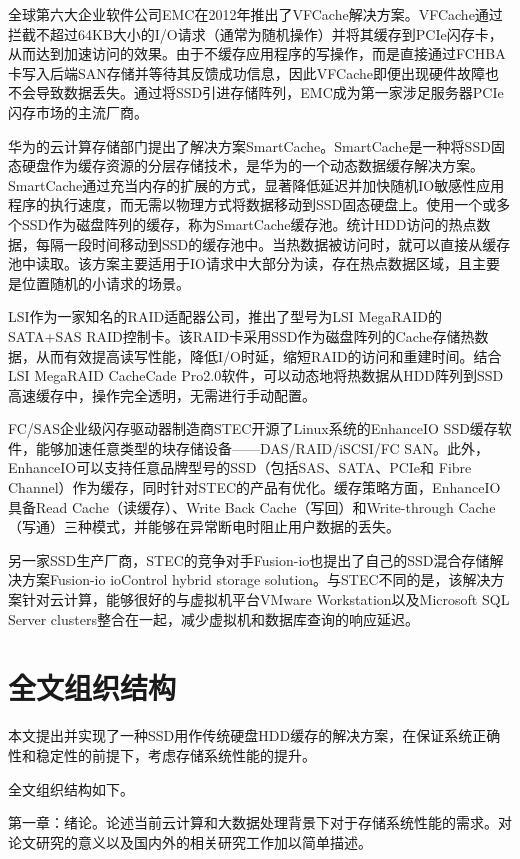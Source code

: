 全球第六大企业软件公司EMC在2012年推出了VFCache解决方案。VFCache通过拦截不超过64KB大小的I/O请求（通常为随机操作）并将其缓存到PCIe闪存卡，从而达到加速访问的效果。由于不缓存应用程序的写操作，而是直接通过FCHBA卡写入后端SAN存储并等待其反馈成功信息，因此VFCache即便出现硬件故障也不会导致数据丢失。通过将SSD引进存储阵列，EMC成为第一家涉足服务器PCIe闪存市场的主流厂商。

华为的云计算存储部门提出了解决方案SmartCache。SmartCache是一种将SSD固态硬盘作为缓存资源的分层存储技术，是华为的一个动态数据缓存解决方案。SmartCache通过充当内存的扩展的方式，显著降低延迟并加快随机IO敏感性应用程序的执行速度，而无需以物理方式将数据移动到SSD固态硬盘上。使用一个或多个SSD作为磁盘阵列的缓存，称为SmartCache缓存池。统计HDD访问的热点数据，每隔一段时间移动到SSD的缓存池中。当热数据被访问时，就可以直接从缓存池中读取。该方案主要适用于IO请求中大部分为读，存在热点数据区域，且主要是位置随机的小请求的场景。

LSI作为一家知名的RAID适配器公司，推出了型号为LSI MegaRAID的SATA+SAS RAID控制卡。该RAID卡采用SSD作为磁盘阵列的Cache存储热数据，从而有效提高读写性能，降低I/O时延，缩短RAID的访问和重建时间。结合LSI MegaRAID CacheCade Pro2.0软件，可以动态地将热数据从HDD阵列到SSD高速缓存中，操作完全透明，无需进行手动配置。

FC/SAS企业级闪存驱动器制造商STEC开源了Linux系统的EnhanceIO SSD缓存软件，能够加速任意类型的块存储设备——DAS/RAID/iSCSI/FC SAN。此外，EnhanceIO可以支持任意品牌型号的SSD（包括SAS、SATA、PCIe和 Fibre Channel）作为缓存，同时针对STEC的产品有优化。缓存策略方面，EnhanceIO具备Read Cache（读缓存）、Write Back Cache（写回）和Write-through Cache（写通）三种模式，并能够在异常断电时阻止用户数据的丢失。

另一家SSD生产厂商，STEC的竞争对手Fusion-io也提出了自己的SSD混合存储解决方案Fusion-io ioControl hybrid storage solution。与STEC不同的是，该解决方案针对云计算，能够很好的与虚拟机平台VMware Workstation以及Microsoft SQL Server clusters整合在一起，减少虚拟机和数据库查询的响应延迟。

\section{全文组织结构}
\label{sec:organization}

本文提出并实现了一种SSD用作传统硬盘HDD缓存的解决方案，在保证系统正确性和稳定性的前提下，考虑存储系统性能的提升。

全文组织结构如下。

第一章：绪论。论述当前云计算和大数据处理背景下对于存储系统性能的需求。对论文研究的意义以及国内外的相关研究工作加以简单描述。

